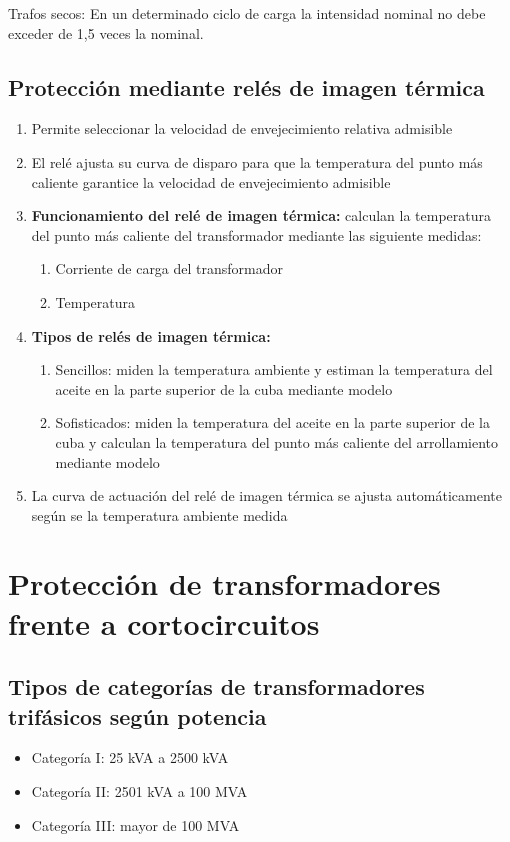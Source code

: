 Trafos secos: En un determinado ciclo de carga la intensidad nominal no debe exceder de 1,5 veces la nominal.
\subsection{Protección mediante relés de imagen térmica}
\begin{enumerate}
	\item Permite seleccionar la velocidad de envejecimiento relativa admisible
	\item El relé ajusta su curva de disparo para que la temperatura del punto más caliente garantice la velocidad de envejecimiento admisible
	\item \textbf{Funcionamiento del relé de imagen térmica:} calculan la temperatura del punto más caliente del transformador mediante las siguiente medidas:
	\begin{enumerate}
		\item Corriente de carga del transformador
		\item Temperatura
	\end{enumerate}
	\item \textbf{Tipos de relés de imagen térmica:}
	\begin{enumerate}
		\item Sencillos: miden la temperatura ambiente y estiman la temperatura del aceite en la parte superior de la cuba mediante modelo
		\item Sofisticados: miden la temperatura del aceite en la parte superior de la cuba y calculan la temperatura del punto más caliente del arrollamiento mediante modelo
	\end{enumerate}
	\item La curva de actuación del relé de imagen térmica se ajusta automáticamente según se la temperatura ambiente medida
\end{enumerate}
\section{Protección de transformadores frente a cortocircuitos}
\subsection{Tipos de categorías de transformadores trifásicos según potencia}
\begin{itemize}
	\item Categoría I: 25 kVA a 2500 kVA
	\item Categoría II: 2501 kVA a 100 MVA
	\item Categoría III: mayor de 100 MVA
\end{itemize}
